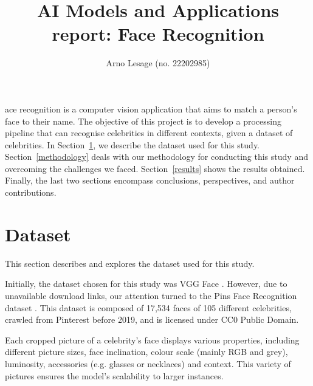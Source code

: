 \documentclass[9pt,twocolumn,twoside]{ilcss}
\title{AI Models and Applications report: Face Recognition}
\author[a]{Arno Lesage (no. 22202985)}
\affil[a]{Université Côte d'Azur EUR - DS4H - Master 1 Informatique, parcours IA}
\theoremstyle{definition}
\theoremstyle{remark}
\theoremstyle{definition}
\theoremstyle{definition}
\begin{document}
\maketitle
\thispagestyle{firststyle}




    ace recognition is a computer vision application that aims to match a person's face to their name. The objective of this project is to develop a processing pipeline that can recognise celebrities in different contexts, given a dataset of celebrities.
    In Section~\ref{dataset}, we describe the dataset used for this study. Section~\ref{methodology} deals with our methodology for conducting this study and overcoming the challenges we faced. Section~\ref{results} shows the results obtained. Finally, the last two sections encompass conclusions, perspectives, and author contributions.

\section{Dataset}\label{dataset}
    This section describes and explores the dataset used for this study.

    Initially, the dataset chosen for this study was VGG Face \cite{Parkhi2015DeepFR}. 
    However, due to unavailable download links, our attention turned to the Pins Face Recognition dataset \cite{PinFaces105Burak}. 
    This dataset is composed of 17,534 faces of 105 different celebrities, crawled from Pinterest before 2019, and is licensed under CC0 Public Domain.
    
    Each cropped picture of a celebrity's face displays various properties, including different picture sizes, face inclination, colour scale (mainly RGB and grey), luminosity, accessories (e.g. glasses or necklaces) and context. 
    This variety of pictures ensures the model's scalability to larger instances.
    
\end{document}
